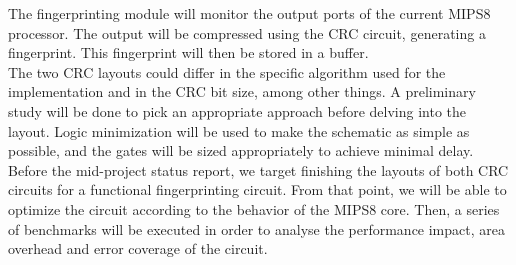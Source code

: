 \documentclass[dvips,12pt]{article}
\begin{document}
The fingerprinting module will monitor the output ports of the current MIPS8 processor. 
The output will be compressed using the CRC circuit, generating a fingerprint. This fingerprint will then be
stored in a buffer.\\

The two CRC layouts could differ in the specific algorithm used for the implementation and in the CRC bit size, among other things.
A preliminary study will be done to pick an appropriate approach before delving into the layout. 
Logic minimization will be used to make the schematic as simple as possible, and the gates will be sized appropriately to achieve minimal delay.\\

Before the mid-project status report, we target finishing the layouts of both CRC circuits for a functional
fingerprinting circuit. From that point, we will be able to optimize the circuit according to the behavior
of the MIPS8 core. Then, a series of benchmarks will be executed in order to analyse the performance
impact, area overhead and error coverage of the circuit.
\end{document}
